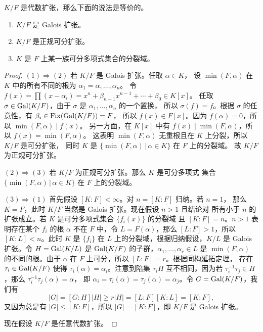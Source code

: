 \begin{theorem}
  $K/F$ 是代数扩张，那么下面的说法是等价的。
  \begin{enumerate}
    \item $K/F$ 是 Galois 扩张。
    \item $K/F$ 是正规可分扩张。
    \item $K$ 是 $F$ 上某一族可分多项式集合的分裂域。
  \end{enumerate}
\end{theorem}
\begin{proof}
  $(1)\Rightarrow (2)$ 若 $K/F$ 是 Galois 扩张。任取 $\alpha\in K$，
  设 $\min(F,\alpha)$ 在 $K$ 中的所有不同的根为 $\alpha_1=\alpha,\dots,\alpha_n$。
  令 $f(x)=\prod(x-\alpha_i)=x^n+\beta_{n-1}x^{n-1}+\cdots+\beta_0\in K[x]$。
  任取 $\sigma\in\operatorname{Gal}(K/F)$，由于 $\sigma$ 是 $\alpha_1,\dots,\alpha_n$ 的一个置换，
  所以 $\sigma(f)=f$。根据 $\sigma$ 的任意性，有 $\beta_i\in\operatorname{Fix}(\operatorname{Gal}(K/F))=F$，
  所以 $f(x)\in F[x]$。因为 $f(\alpha)=0$，所以 $\min(F,\alpha)\mid f(x)$。
  另一方面，在 $K[x]$ 中有 $f(x)\mid \min(F,\alpha)$，所以 $f(x)=\min(F,\alpha)$。
  这表明 $\min(F,\alpha)$ 无重根且在 $K$ 上分裂，所以 $K/F$ 是可分扩张，
  同时 $K$ 是 $\{\min(F,\alpha)\,|\,\alpha\in K\}$ 在 $F$ 上的分裂域。
  故 $K/F$ 为正规可分扩张。

  $(2)\Rightarrow (3)$ 若 $K/F$ 为正规可分扩张。那么 $K$ 是可分多项式
  集合 $\{\min(F,\alpha)\,|\,\alpha\in K\}$ 在 $F$ 上的分裂域。

  $(3)\Rightarrow (1)$ 首先假设 $[K:F]<\infty$。对 $n=[K:F]$ 归纳。若 $n=1$，
  那么 $K=F$，此时 $K/F$ 当然是 Galois 扩张。现在假设 $n>1$ 且结论对
  所有小于 $n$ 的扩张成立。若 $K$ 是可分多项式集合 $\{f_i(x)\}$ 的分裂域
  且 $[K:F]=n$。$n>1$ 表明存在某个 $f_i$ 的根 $\alpha$ 不在 $F$ 中，令 
  $L=F(\alpha)$，那么 $[L:F]>1$，所以 $[K:L]<n$。此时 $K$ 是 $\{f_i\}$
  在 $L$ 上的分裂域，根据归纳假设，$K/L$ 是 Galois 扩张。令 $H=\operatorname{Gal}(K/L)$
  是 $\operatorname{Gal}(K/F)$ 的子群，$\alpha_1,\dots,\alpha_r\in L$ 是 $\min(F,\alpha)$
  的不同的根。由于 $\alpha$ 在 $F$ 上可分，所以 $[L:F]=r$。根据同构延拓定理，
  存在 $\tau_i\in\operatorname{Gal}(K/F)$ 使得 $\tau_i(\alpha)=\alpha_i$。注意到陪集
  $\tau_iH$ 互不相同，因为若 $\tau_i^{-1}\tau_j\in H$，那么 $\tau_i^{-1}\tau_j(\alpha)=\alpha$，
  即 $\alpha_i=\tau_i(\alpha)=\tau_j(\alpha)=\alpha_j$。令 $G=\operatorname{Gal}(K/F)$，我们有
  \[
    |G|=[G:H]|H|\geq r|H|=[L:F][K:L]=[K:F],
  \]
  又因为总是有 $|G|\leq [K:F]$，所以 $|G|=[K:F]$，即 $K/F$ 是 Galois 扩张。

  现在假设 $K/F$ 是任意代数扩张。
\end{proof}

